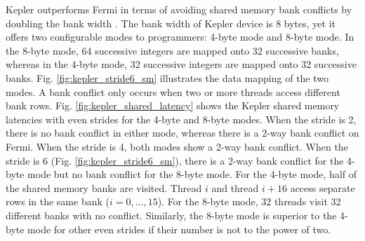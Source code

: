 \documentclass[10pt,journal,compsoc]{IEEEtran}
\theoremstyle{definition}
\begin{document}
\begin{figure*}
\vspace{-1em}
  \caption{Latency of Kepler Shared Memory with bank conflict: 4-byte mode v.s. 8-byte mode.}
  \label{fig:kepler_shared_latency}
\end{figure*}

Kepler outperforms Fermi in terms of avoiding shared memory bank conflicts by doubling the bank width \cite{micikevicius2012gpu}. The bank width of Kepler device is 8 bytes, yet it offers two configurable modes to programmers: 4-byte mode and 8-byte mode. In the 8-byte mode, 64 successive integers are mapped onto 32 successive banks, whereas in the 4-byte mode, 32 successive integers are mapped onto 32 successive banks. Fig. \ref{fig:kepler_stride6_sm} illustrates the data mapping of the two modes. A bank conflict only occurs when two or more threads access different bank rows.
Fig. \ref{fig:kepler_shared_latency} shows the Kepler shared memory latencies with even strides for the 4-byte and 8-byte modes. When the stride is 2, there is no bank conflict in either mode, whereas there is a 2-way bank conflict on Fermi. When the stride is 4, both modes show a 2-way bank conflict. When the stride is 6 (Fig. \ref{fig:kepler_stride6_sm}), there is a 2-way bank conflict for the 4-byte mode but no bank conflict for the 8-byte mode. For the 4-byte mode, half of the shared memory banks are visited. Thread $i$ and thread $i+16$ access separate rows in the same bank ($i=0,...,15$). For the 8-byte mode, 32 threads visit 32 different banks with no conflict. Similarly, the 8-byte mode is superior to the 4-byte mode for other even strides if their number is not to the power of two.
\end{document}
